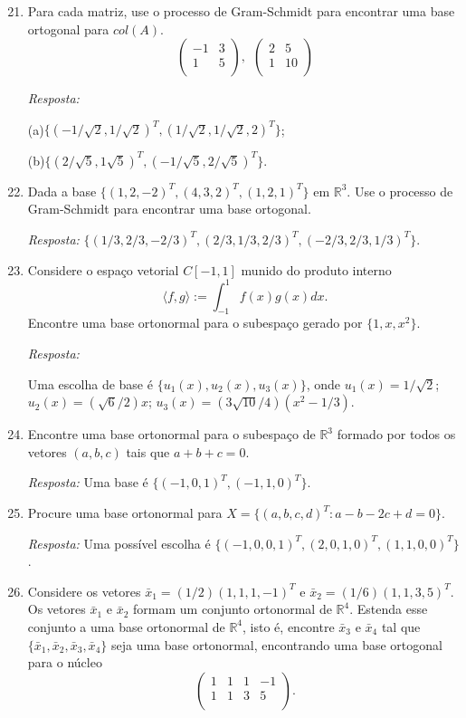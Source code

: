 \documentclass[10pt]{article}
\theoremstyle{plain}
\theoremstyle{obs}
\numberwithin{equation}{section}
\begin{document}
 \begin{enumerate}
 \setcounter{enumi}{20}
 \item Para cada matriz, use o processo de 
 Gram-Schmidt para encontrar uma base ortogonal para 
 $col(A)$.
 $$
\begin{pmatrix}
-1 & 3 \\
1 & 5 \\
\end{pmatrix}, \ \
\begin{pmatrix}
2 & 5 \\%
1 & 10 \\
\end{pmatrix} 
 $$ 
 
 {\it Resposta:}
 
 (a)$\{(-1/\sqrt{2},1/\sqrt{2})^{T},
       (1/\sqrt{2},1/\sqrt{2},2)^{T}\}$;
 
 (b)$\{(2/\sqrt{5},1\sqrt{5})^{T},
       (-1/\sqrt{5},2/\sqrt{5})^{T}\}$.
 \item Dada a base 
 $\{(1,2,-2)^{T},(4,3,2)^{T},(1,2,1)^{T}\}$ 
 em $\mathbb{R}^{3}$.
 Use o processo de Gram-Schmidt para encontrar uma base 
 ortogonal. 
 
 {\it Resposta:} 
 $\{(1/3,2/3,-2/3)^{T},(2/3,1/3,2/3)^{T},(-2/3,2/3,1/3)^{T}\}$.
 \item Considere o espaço vetorial $C[-1,1]$ munido do produto 
 interno 
 $$ \langle f, g \rangle := \int_{-1}^{1} f(x)g(x)dx. $$
 Encontre uma base ortonormal para o subespaço gerado por 
 $\{1,x,x^2\}$.
 
 {\it Resposta:} 
 
 Uma escolha de base é $\{u_1(x),u_2(x), u_3(x)\}$, onde 
 $u_{1}(x)=1/\sqrt{2}$; $u_{2}(x)=(\sqrt{6}/2)x$; $u_{3}(x)=(3\sqrt{10}/4)(x^2-1/3)$.
 
 \item Encontre uma base ortonormal para o subespaço de $\mathbb{R}^{3}$ 
 formado por todos os vetores $(a,b,c)$ tais que $a+b+c=0$.
 
 {\it Resposta:} Uma base é $\{(-1,0,1)^{T}, (-1,1,0)^{T}\}$.
 
 \item Procure uma base ortonormal para $X=\{(a,b,c,d)^{T}: a-b-2c+d=0\}$. 
 
 {\it Resposta:} Uma possível escolha é 
 $\{(-1,0,0,1)^{T}, (2,0,1,0)^{T}, (1,1,0,0)^{T}\}$.

 \item Considere os vetores 
 $\bar{x}_1=(1/2)(1,1,1,-1)^{T}$
 e $\bar{x}_2=(1/6)(1,1,3,5)^{T}$.
 Os vetores $\bar{x}_1$ e $\bar{x}_2$ formam um conjunto ortonormal de 
 $\mathbb{R}^{4}$. Estenda esse conjunto a uma base ortonormal de $\mathbb{R}^{4}$, 
 isto é, encontre $\bar{x}_3$ e $\bar{x}_4$ tal que 
 $\{\bar{x}_1,\bar{x}_2,\bar{x}_3, \bar{x}_4\}$
 seja uma base ortonormal, encontrando uma base ortogonal para o núcleo
 $$
 \begin{pmatrix}
1 & 1 & 1 & -1 \\%
1 & 1 & 3 & 5 \\
\end{pmatrix}.  
 $$ 
 \end{enumerate}
\end{document}
